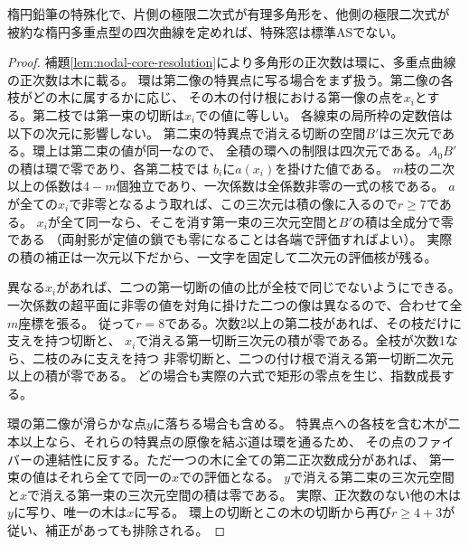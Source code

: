 \begin{proposition}[多角形と楕円多重点を組み合わせた二側の排除]\label{prop:polygon-additive-exclusion}
楕円鉛筆の特殊化で、片側の極限二次式が有理多角形を、他側の極限二次式が
被約な楕円多重点型の四次曲線を定めれば、特殊窓は標準ASでない。
\end{proposition}
\begin{proof}
補題\ref{lem:nodal-core-resolution}により多角形の正次数は環に、多重点曲線の正次数は木に載る。
環は第二像の特異点に写る場合をまず扱う。第二像の各枝がどの木に属するかに応じ、
その木の付け根における第一像の点を$x_i$とする。第二枝では第一束の切断は$x_i$での値に等しい。
各線束の局所枠の定数倍は以下の次元に影響しない。
第二束の特異点で消える切断の空間$B'$は三次元である。環上は第二束の値が同一なので、
全積の環への制限は四次元である。$A_0 B'$の積は環で零であり、各第二枝では
$b_i$に$a(x_i)$を掛けた値である。
$m$枝の二次以上の係数は$4-m$個独立であり、一次係数は全係数非零の一式の核である。
$a$が全ての$x_i$で非零となるよう取れば、この三次元は積の像に入るので$r\ge7$である。
$x_i$が全て同一なら、そこを消す第一束の三次元空間と$B'$の積は全成分で零である
（両射影が定値の鎖でも零になることは各端で評価すればよい）。
実際の積の補正は一次元以下だから、一文字を固定して二次元の評価核が残る。

異なる$x_i$があれば、二つの第一切断の値の比が全枝で同じでないようにできる。
一次係数の超平面に非零の値を対角に掛けた二つの像は異なるので、合わせて全$m$座標を張る。
従って$r=8$である。次数2以上の第二枝があれば、その枝だけに支えを持つ切断と、
$x_i$で消える第一切断三次元の積が零である。全枝が次数1なら、二枝のみに支えを持つ
非零切断と、二つの付け根で消える第一切断二次元以上の積が零である。
どの場合も実際の六式で矩形の零点を生じ、指数成長する。

環の第二像が滑らかな点$y$に落ちる場合も含める。
特異点への各枝を含む木が二本以上なら、それらの特異点の原像を結ぶ道は環を通るため、
その点のファイバーの連結性に反する。ただ一つの木に全ての第二正次数成分があれば、
第一束の値はそれら全てで同一の$x$での評価となる。
$y$で消える第二束の三次元空間と$x$で消える第一束の三次元空間の積は零である。
実際、正次数のない他の木は$y$に写り、唯一の木は$x$に写る。
環上の切断とこの木の切断から再び$r\ge4+3$が従い、補正があっても排除される。
\end{proof}

